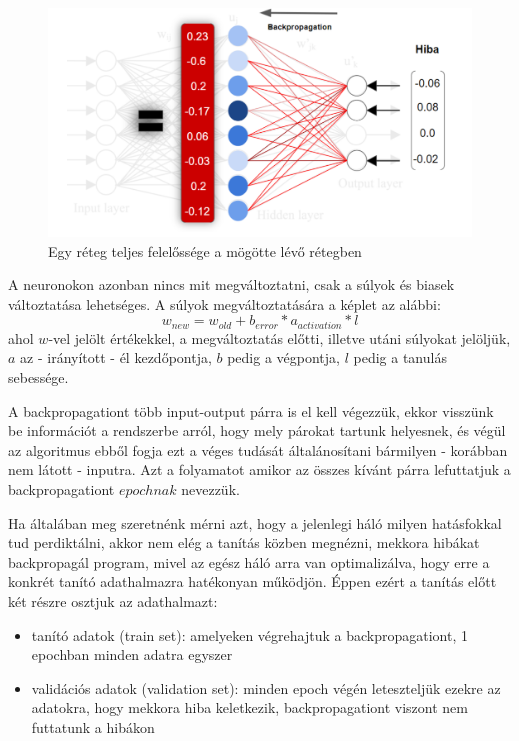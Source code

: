 \documentclass[12pt]{article}
\begin{document}
\begin{figure}[h!]
  \includegraphics[width=\linewidth]{backprop_all_error.png}
  \caption{Egy réteg teljes felelőssége a mögötte lévő rétegben}
\end{figure}

A neuronokon azonban nincs mit megváltoztatni, csak a súlyok és biasek változtatása lehetséges. A súlyok megváltoztatására a képlet az alábbi:
$$ w_{new} =  w_{old} + b_{error} * a_{activation} * l $$
ahol $w$-vel jelölt értékekkel, a megváltoztatás előtti, illetve utáni súlyokat jelöljük, $a$ az - irányított - él kezdőpontja, $b$ pedig a végpontja, $l$ pedig a tanulás sebessége.

A backpropagationt több input-output párra is el kell végezzük, ekkor visszünk be információt a rendszerbe arról, hogy mely párokat tartunk helyesnek, és végül az algoritmus ebből fogja ezt a véges tudását általánosítani bármilyen - korábban nem látott - inputra. Azt a folyamatot amikor az összes kívánt párra lefuttatjuk a backpropagationt $epochnak$ nevezzük. 

Ha általában meg szeretnénk mérni azt, hogy a jelenlegi háló milyen hatásfokkal tud perdiktálni, akkor nem elég a tanítás közben megnézni, mekkora hibákat backpropagál program, mivel az egész háló arra van optimalizálva, hogy erre a konkrét tanító adathalmazra hatékonyan működjön. Éppen ezért a tanítás előtt két részre osztjuk az adathalmazt:

\begin{itemize}  
	\item tanító adatok (train set): amelyeken végrehajtuk a backpropagationt, 1 epochban minden adatra egyszer
	\item validációs adatok (validation set): minden epoch végén leteszteljük ezekre az adatokra, hogy mekkora hiba keletkezik, backpropagationt viszont nem futtatunk a hibákon
\end{itemize}
\end{document}
